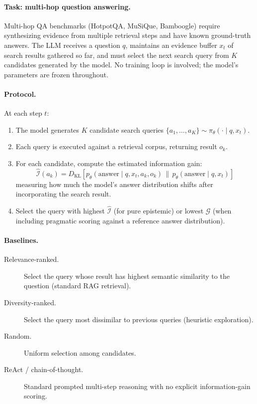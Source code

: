 \documentclass[11pt]{article}
\newcommand{\EFE}{\mathcal{G}}
\newcommand{\KL}[2]{D_{\mathrm{KL}}\!\left[#1 \,\|\, #2\right]}
\begin{document}
\paragraph{Task: multi-hop question answering.}
Multi-hop QA benchmarks (HotpotQA, MuSiQue, Bamboogle) require synthesizing evidence from multiple retrieval steps and have known ground-truth answers. The LLM receives a question $q$, maintains an evidence buffer $x_t$ of search results gathered so far, and must select the next search query from $K$ candidates generated by the model. No training loop is involved; the model's parameters are frozen throughout.

\paragraph{Protocol.}
At each step $t$:
\begin{enumerate}
    \item The model generates $K$ candidate search queries $\{a_1, \ldots, a_K\} \sim \pi_\theta(\cdot \mid q, x_t)$.
    \item Each query is executed against a retrieval corpus, returning result $o_k$.
    \item For each candidate, compute the estimated information gain:
    \begin{equation}
    \label{eq:exp-ig}
    \hat{\mathcal{I}}(a_k) = \KL{p_\theta(\text{answer} \mid q, x_t, a_k, o_k)}{p_\theta(\text{answer} \mid q, x_t)}
    \end{equation}
    measuring how much the model's answer distribution shifts after incorporating the search result.
    \item Select the query with highest $\hat{\mathcal{I}}$ (for pure epistemic) or lowest $\EFE$ (when including pragmatic scoring against a reference answer distribution).
\end{enumerate}

\paragraph{Baselines.}
\begin{description}
    \item[Relevance-ranked.] Select the query whose result has highest semantic similarity to the question (standard RAG retrieval).
    \item[Diversity-ranked.] Select the query most dissimilar to previous queries (heuristic exploration).
    \item[Random.] Uniform selection among candidates.
    \item[ReAct / chain-of-thought.] Standard prompted multi-step reasoning with no explicit information-gain scoring.
\end{description}
\end{document}
